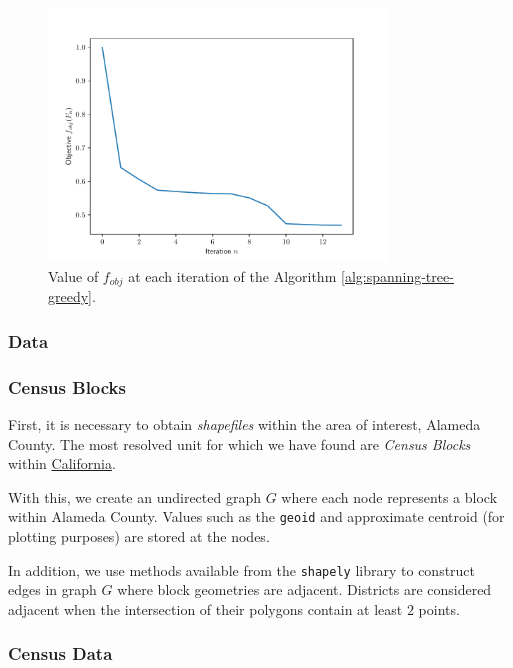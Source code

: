 \documentclass{article}
\begin{document}
\begin{figure}[h]
    \centering
    \includegraphics[width=0.8\textwidth]{figure/convergence.pdf}
    \caption{Value of \(f_{obj}\) at each iteration of the Algorithm \ref{alg:spanning-tree-greedy}.}
    \label{fig:convergence}
\end{figure}

\subsubsection{Data}

\subsubsection*{Census Blocks}

First, it is necessary to obtain \textit{shapefiles} within the area of interest, Alameda County. The most resolved unit for which we have found are \textit{Census Blocks} within \href{https://www2.census.gov/geo/tiger/TIGER2018/TABBLOCK/tl_2018_06_tabblock10.zip}{California}.

With this, we create an undirected graph \(G\) where each node represents a block within Alameda County. Values such as the \texttt{geoid} and approximate centroid (for plotting purposes) are stored at the nodes.

In addition, we use methods available from the \texttt{shapely} library to construct edges in graph \(G\) where block geometries are adjacent. Districts are considered adjacent when the intersection of their polygons contain at least \(2\) points.

\subsubsection*{Census Data}
\end{document}

